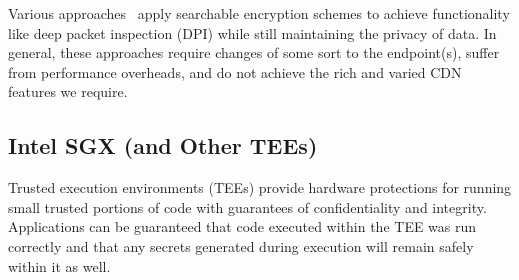 Various approaches~\cite{desmoulins2018pattern,
sherry2015blindbox, canard2017blindids,lan2016embark} apply searchable
encryption schemes to achieve functionality like deep packet inspection (DPI)
while still maintaining the privacy of data.
%
In general, these approaches require changes of some sort to the endpoint(s),
suffer from performance overheads, and do not achieve the rich and varied CDN
features we require.


%
%
%
%
%

\subsection{Intel SGX (and Other TEEs)}
\label{sec:sgxbackground}
Trusted execution environments (TEEs) provide hardware protections for running
small trusted portions of code with guarantees of confidentiality and
integrity.  Applications can be guaranteed that code executed within the
TEE was run correctly and that any secrets generated during execution
will remain safely within it as well.

